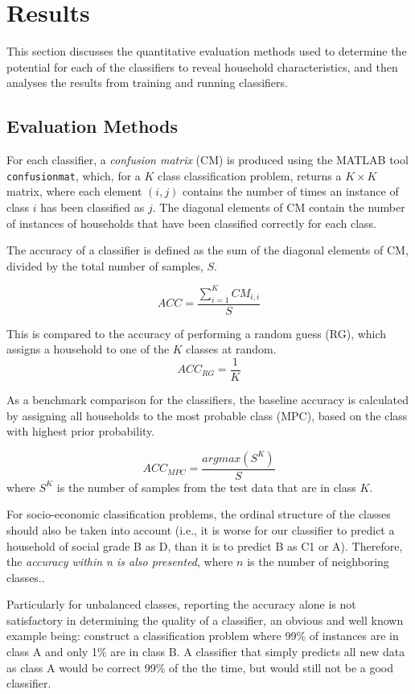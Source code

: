 \chapter{Results}
\label{ch:Results}
This section discusses the quantitative evaluation methods used to determine the potential for each of the classifiers to reveal household characteristics, and then analyses the results from training and running classifiers.

\section{Evaluation Methods}
\label{sec:evalMethods}
For each classifier, a \textit{confusion matrix} (CM) is produced using the MATLAB tool \texttt{confusionmat}, which, for a $K$ class classification problem, returns a $K\times K$ matrix, where each element $(i,j)$ contains the number of times an instance of class $i$ has been classified as $j$. The diagonal elements of CM contain the number of instances of households that have been classified correctly for each class. \cite{Stefanowski}


The accuracy of a classifier is defined as the sum of the diagonal elements of CM, divided by the total number of samples, $S$.

\[ACC=\frac{\sum_{i=1}^KCM_{i,i}}{S}\]

This is compared to the accuracy of performing a random guess (RG), which assigns a household to one of the $K$ classes at random.
\[ACC_{RG}=\frac{1}{K}\]

As a benchmark comparison for the classifiers, the baseline accuracy is calculated by assigning all households to the most probable class (MPC), based on the class with highest prior probability.   

\[ACC_{MPC}=\frac{argmax(S^K)}{S}\]
where $S^K$ is the number of samples from the test data that are in class $K$.

\bigskip

For socio-economic classification problems, the ordinal structure of the classes should also be taken into account (i.e., it is worse for our classifier to predict a household of social grade B as D, than it is to predict B as C1 or A). Therefore, the \textit{accuracy within n is also presented}, where $n$ is the number of neighboring classes.\cite{Gaudette}. 

Particularly for unbalanced classes, reporting the accuracy alone is not satisfactory in determining the quality of a classifier, an obvious and well known example being: construct a classification problem where 99\% of instances are in class A and only 1\% are in class B. A classifier that simply predicts all new data as class A would be correct 99\% of the the time, but would still not be a good classifier. 

